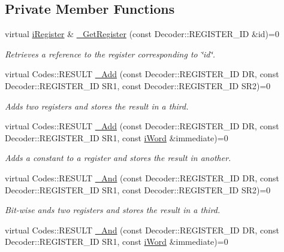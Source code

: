 \subsection*{Private Member Functions}
\begin{DoxyCompactItemize}
\item 
virtual \hyperlink{classiRegister}{iRegister} \& \hyperlink{classiWi11_aa1696b5bb260a94e1fb4a9922369cebf}{\_\-GetRegister} (const Decoder::REGISTER\_\-ID \&id)=0
\begin{DoxyCompactList}\small\item\em Retrieves a reference to the register corresponding to \char`\"{}id\char`\"{}. \item\end{DoxyCompactList}\item 
virtual Codes::RESULT \hyperlink{classiWi11_a65f699c773084a631cd7373cae05b5da}{\_\-Add} (const Decoder::REGISTER\_\-ID DR, const Decoder::REGISTER\_\-ID SR1, const Decoder::REGISTER\_\-ID SR2)=0
\begin{DoxyCompactList}\small\item\em Adds two registers and stores the result in a third. \item\end{DoxyCompactList}\item 
virtual Codes::RESULT \hyperlink{classiWi11_a6345dc089e3a699bd30fc442bd8f6d85}{\_\-Add} (const Decoder::REGISTER\_\-ID DR, const Decoder::REGISTER\_\-ID SR1, const \hyperlink{classiWord}{iWord} \&immediate)=0
\begin{DoxyCompactList}\small\item\em Adds a constant to a register and stores the result in another. \item\end{DoxyCompactList}\item 
virtual Codes::RESULT \hyperlink{classiWi11_a90cd8f3daa1788f029cabe198c19efb3}{\_\-And} (const Decoder::REGISTER\_\-ID DR, const Decoder::REGISTER\_\-ID SR1, const Decoder::REGISTER\_\-ID SR2)=0
\begin{DoxyCompactList}\small\item\em Bit-\/wise ands two registers and stores the result in a third. \item\end{DoxyCompactList}\item 
virtual Codes::RESULT \hyperlink{classiWi11_a4785e197f77fb0861e97e8d18c3be96f}{\_\-And} (const Decoder::REGISTER\_\-ID DR, const Decoder::REGISTER\_\-ID SR1, const \hyperlink{classiWord}{iWord} \&immediate)=0

\end{DoxyCompactItemize}
